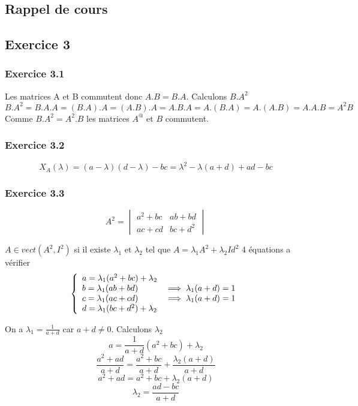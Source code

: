 \documentclass[]{book}
\theoremstyle{definition}
\begin{document}
\subsection*{Rappel de cours}



\newpage

\subsection*{Exercice 3}
\subsubsection*{Exercice 3.1}
Les matrices A et B commutent donc $A.B = B.A$. Calculons $B.A^2$
$$
B.A^2 = B.A.A = (B.A).A = (A.B).A = A.B.A = A.(B.A) = A.(A.B) = A.A.B = A^2B
$$
Comme $B.A^2 = A^2.B$ les matrices $A^@$ et $B$ commutent.

\subsubsection*{Exercice 3.2}
$$
X_A(\lambda) = (a-\lambda)(d-\lambda)-bc = \lambda^2 -\lambda(a+d) + ad-bc
$$

\subsubsection*{Exercice 3.3}
$$
A^2 = \begin{vmatrix} a^2+bc & ab+bd \\ ac+cd & bc+d^2 \end{vmatrix}
$$

$A \in vect(A^2, I^2)$ si il existe $\lambda_1$ et $\lambda_2$ tel que $A = \lambda_1A^2 + \lambda_2Id^2$
4 \'equations a v\'erifier
$$
\left\{
\begin{array}{l l}
a = \lambda_1(a^2+bc) + \lambda_2 & \\
b = \lambda_1(ab+bd) & \implies \lambda_1(a+d) = 1\\
c = \lambda_1(ac+cd) & \implies \lambda_1(a+d) = 1\\
d = \lambda_1(bc+d^2) + \lambda_2 & \\
\end{array}
\right.
$$

On a $\lambda_1 = \frac{1}{a+d}$ car $a+d \neq 0$. Calculons $\lambda_2$
$$
a = \frac{1}{a+d}(a^2+bc) + \lambda_2
$$
$$
\frac{a^2+ad}{a+d} = \frac{a^2+bc}{a+d} + \frac{\lambda_2(a+d)}{a+d}
$$
$$
a^2+ad = a^2+bc + \lambda_2(a+d)
$$
$$
\lambda_2 = \frac{ad - bc}{a+d}
$$
\end{document}
